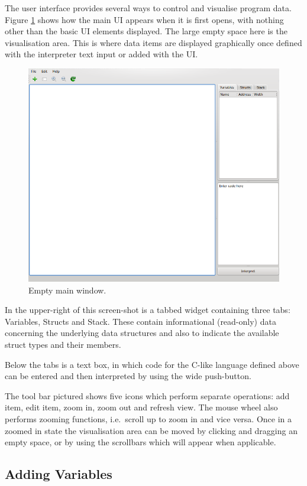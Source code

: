 \documentclass[a4paper,11pt]{article}
\begin{document}
The user interface provides several ways to control and visualise program data.
Figure \ref{fig:mainwindow1} shows how the main UI appears when it is first opens, with nothing other than the basic UI elements displayed.
The large empty space here is the visualisation area.
This is where data items are displayed graphically once defined with the interpreter text input or added with the UI.
\begin{figure}[h!]
\includegraphics[width=\textwidth]{mainwindow1}
\caption{Empty main window.}
\label{fig:mainwindow1}
\end{figure}
In the upper-right of this screen-shot is a tabbed widget containing three tabs: Variables, Structs and Stack.
These contain informational (read-only) data concerning the underlying data structures and also to indicate the available struct types and their members.

Below the tabs is a text box, in which code for the C-like language defined above can be entered and then interpreted by using the wide push-button.

The tool bar pictured shows five icons which perform separate operations: add item, edit item, zoom in, zoom out and refresh view.
The mouse wheel also performs zooming functions, i.e.\ scroll up to zoom in and vice versa.
Once in a zoomed in state the visualisation area can be moved by clicking and dragging an empty space, or by using the scrollbars which will appear when applicable.

\subsection{Adding Variables}
\end{document}
